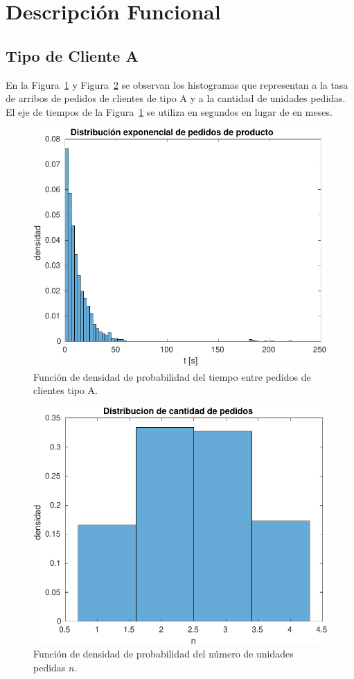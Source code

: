 \documentclass[10pt]{article}
\begin{document}
\section{Descripción Funcional}
\subsection{Tipo de Cliente A}

En la Figura~\ref{fig:pdftiempo} y Figura~\ref{fig:pdfpedidos} se observan los histogramas que representan a la tasa de arribos de pedidos de clientes de tipo A y a la cantidad de unidades pedidas. El eje de tiempos de la Figura~\ref{fig:pdftiempo} se utiliza en segundos en lugar de en meses.

\begin{figure}
\centering
\includegraphics[scale=1]{img/pdf_tiempo_pedidos}
\caption{Función de densidad de probabilidad del tiempo entre pedidos de clientes tipo A.}
\label{fig:pdftiempo}
\end{figure}

\begin{figure}
\centering
\includegraphics[scale=1]{img/pdf_cantidad_pedidos}
\caption{Función de densidad de probabilidad del número de unidades pedidas $n$.}
\label{fig:pdfpedidos}
\end{figure}
\end{document}
